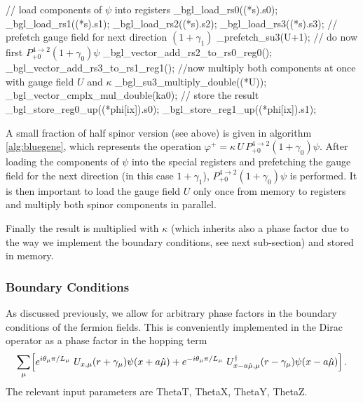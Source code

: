 \begin{algorithm}[t]
  \caption{$\varphi^+ = \kappa\, U\, P_{+0}^{4\to2}(1+\gamma_0)\psi$}
  \begin{algorithmic}[1]
    \STATE // load components of $\psi$ into registers
    \STATE \_bgl\_load\_rs0((*s).s0);
    \STATE \_bgl\_load\_rs1((*s).s1);
    \STATE \_bgl\_load\_rs2((*s).s2);
    \STATE \_bgl\_load\_rs3((*s).s3);
    \STATE // prefetch gauge field for next direction $(1+\gamma_1)$
    \STATE \_prefetch\_su3(U+1);
    \STATE // do now first $P_{+0}^{4\to2}(1+\gamma_0)\psi$
    \STATE \_bgl\_vector\_add\_rs2\_to\_rs0\_reg0();
    \STATE \_bgl\_vector\_add\_rs3\_to\_rs1\_reg1();
    \STATE //now multiply both components at once with gauge field $U$ and $\kappa$
    \STATE \_bgl\_su3\_multiply\_double((*U));
    \STATE \_bgl\_vector\_cmplx\_mul\_double(ka0); 
    \STATE // store the result
    \STATE \_bgl\_store\_reg0\_up((*phi[ix]).s0);
    \STATE \_bgl\_store\_reg1\_up((*phi[ix]).s1);
  \end{algorithmic}
  \label{alg:bluegene}
\end{algorithm}

A small fraction of half spinor version (see above) is given in
algorithm \ref{alg:bluegene}, which represents the operation
$\varphi^+ = \kappa\, U\, P_{+0}^{4\to2}(1+\gamma_0)\psi$. After
loading the components of $\psi$ into the special registers and 
prefetching the gauge field for the next direction (in this case
$1+\gamma_1$), $P_{+0}^{4\to2}(1+\gamma_0)\psi$ is performed. It is
then important to load the gauge field $U$ only once from memory to
registers and multiply both spinor components in parallel. 

Finally the result is multiplied with $\kappa$ (which inherits also a
phase factor due to the way we implement the boundary conditions, see
next sub-section) and stored in memory.


\subsubsection{Boundary Conditions}

As discussed previously, we allow for arbitrary phase factors in the
boundary conditions of the fermion fields. This is conveniently
implemented in the Dirac operator as a phase factor in the hopping
term
\[
\sum_\mu \Bigl[
    e^{i\theta_\mu \pi/L_\mu}\ U_{x,\mu}(r+\gamma_\mu)
    \psi(x+a\hat\mu)  + e^{-i\theta_\mu \pi/L_\mu}\
    U^\dagger_{x-a\hat\mu,\mu} 
    (r-\gamma_\mu)\psi(x-a\hat\mu)\Bigr]\, .
\]
The relevant input parameters are {\ttfamily ThetaT}, {\ttfamily
  ThetaX}, {\ttfamily ThetaY}, {\ttfamily ThetaZ}. 



